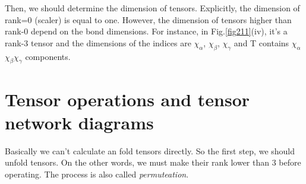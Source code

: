 	Then, we should determine the dimension of tensors. Explicitly, the dimension of rank=0 (scaler) is equal to one. However, the dimension of tensors higher than rank-0 depend on the bond dimensions. For instance, in Fig.\ref{fig211}(iv), it's a rank-3 tensor and the dimensions of the indices are $\chi_{\alpha}$, $\chi_{\beta}$, $\chi_{\gamma}$ and T contains $\chi_{\alpha}$$\chi_{\beta}$$\chi_{\gamma}$ components.

\section{Tensor operations and tensor network diagrams} %
\label{operation}
Basically we can't calculate an fold tensors directly. So the first step, we should unfold tensors. On the other words, we must make their rank lower than 3 before operating. The process is also called \textit{permuteation}.

